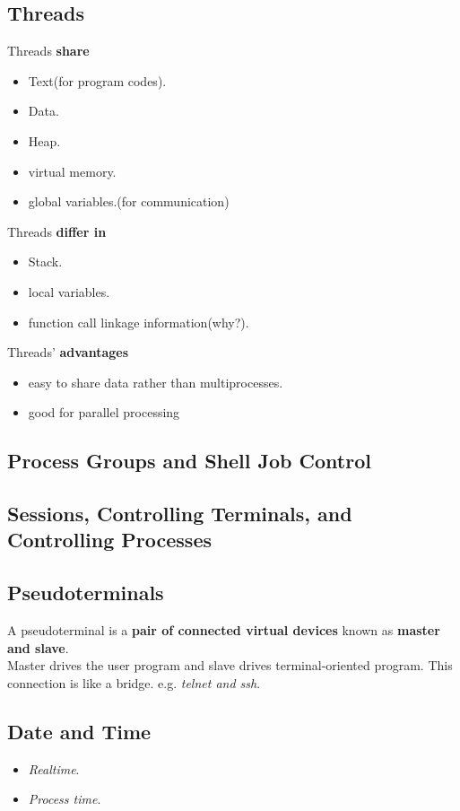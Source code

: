 \documentclass{article}
\numberwithin{equation}{section}
\numberwithin{figure}{section}
\begin{document}
\subsection{Threads}
Threads \textbf{share}
\begin{itemize}
\item Text(for program codes).
\item Data.
\item Heap.
\item virtual memory.
\item global variables.(for communication)
\end{itemize}
Threads \textbf{differ in}
\begin{itemize}
\item Stack.
\item local variables.
\item function call linkage information(why?).
\end{itemize}
Threads' \textbf{advantages}
\begin{itemize}
\item easy to share data rather than multiprocesses.
\item good for parallel processing
\end{itemize}

\subsection{Process Groups and Shell Job Control}
\subsection{Sessions, Controlling Terminals, and Controlling Processes}
\subsection{Pseudoterminals}
A pseudoterminal is a \textbf{pair of connected virtual devices} known as \textbf{master and slave}.\\
Master drives the user program and slave drives terminal-oriented program. This connection is like a bridge. e.g. \textit{telnet and ssh}.
\subsection{Date and Time}
\begin{itemize}
\item \textit{Realtime}.
\item \textit{Process time}.
\end{itemize}
\end{document}
